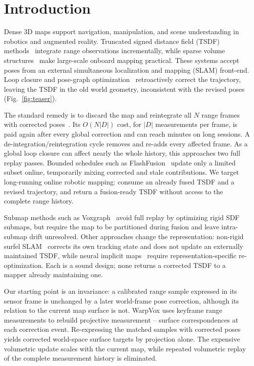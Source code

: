 \section{Introduction}
\label{sec:intro}

Dense 3D maps support navigation, manipulation, and scene understanding in robotics and augmented reality. Truncated signed distance field (TSDF) methods~\cite{10.1145/237170.237269,newcombe2011kinectfusion} integrate range observations incrementally, while sparse volume structures~\cite{10.1145/2508363.2508374,Oleynikova_2017,vizzo2022vdbfusion} make large-scale onboard mapping practical. These systems accept poses from an external simultaneous localization and mapping (SLAM) front-end. Loop closure and pose-graph optimization~\cite{ORBSLAM3_TRO,5979949} retroactively correct the trajectory, leaving the TSDF in the old world geometry, inconsistent with the revised poses (Fig.~\ref{fig:teaser}).

The standard remedy is to discard the map and reintegrate all $N$ range frames with corrected poses~\cite{Cramariuc_2023,kimera_pgmo}. Its $O(N|D|)$ cost, for $|D|$ measurements per frame, is paid again after every global correction and can reach minutes on long sessions. A de-integration/reintegration cycle removes and re-adds every affected frame. As a global loop closure can affect nearly the whole history, this approaches two full replay passes. Bounded schedules such as FlashFusion~\cite{han2018flashfusion} update only a limited subset online, temporarily mixing corrected and stale contributions. We target long-running online robotic mapping: consume an already fused TSDF and a revised trajectory, and return a fusion-ready TSDF without access to the complete range history.

Submap methods such as Voxgraph~\cite{reijgwart2020voxgraph} avoid full replay by optimizing rigid SDF submaps, but require the map to be partitioned during fusion and leave intra-submap drift unresolved. Other approaches change the representation: non-rigid surfel SLAM~\cite{whelan2016elasticfusion} corrects its own tracking state and does not update an externally maintained TSDF, while neural implicit maps~\cite{sucar2021imap,zhu2022niceslam,liso2024loopyslam,bruns2024neuralgraphmap} require representation-specific re-optimization. Each is a sound design; none returns a corrected TSDF to a mapper already maintaining one.

Our starting point is an invariance: a calibrated range sample expressed in its sensor frame is unchanged by a later world-frame pose correction, although its relation to the current map surface is not. WarpVox uses keyframe range measurements to rebuild projective measurement -- surface correspondences at each correction event. Re-expressing the matched samples with corrected poses yields corrected world-space surface targets by projection alone. The expensive volumetric update scales with the current map, while repeated volumetric replay of the complete measurement history is eliminated. 

